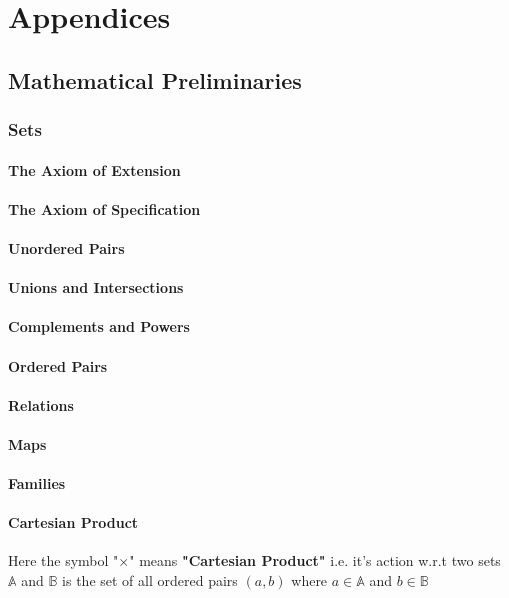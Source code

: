 \chapter*{Appendices}
\setcounter{section}{0}

\renewcommand{\thesection}{\Alph{section}}

\section{Mathematical Preliminaries}
\label{appendix_a}
\subsection{Sets}
\subsubsection{The Axiom of Extension}
\subsubsection{The Axiom of Specification}
\subsubsection{Unordered Pairs}
\subsubsection{Unions and Intersections}
\subsubsection{Complements and Powers}
\subsubsection{Ordered Pairs}
\subsubsection{Relations}
\subsubsection{Maps}
\subsubsection{Families}
\subsubsection{Cartesian Product}
Here the symbol "$\times$" means \textbf{"Cartesian Product"} i.e. it's action w.r.t two sets $\mathbb{A}$ and $\mathbb{B}$ is the set of all ordered pairs $(a, b)$ where $a \in \mathbb{A}$ and $b \in \mathbb{B}$
